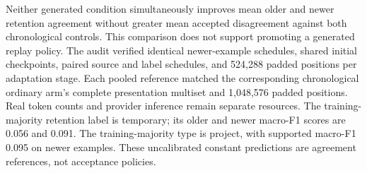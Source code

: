 Neither generated condition simultaneously improves mean older and newer retention agreement without greater mean accepted disagreement against both chronological controls. This comparison does not support promoting a generated replay policy.
The audit verified identical newer-example schedules, shared initial checkpoints, paired source and label schedules, and 524,288 padded positions per adaptation stage. Each pooled reference matched the corresponding chronological ordinary arm's complete presentation multiset and 1,048,576 padded positions. Real token counts and provider inference remain separate resources.
The training-majority retention label is temporary; its older and newer macro-F1 scores are 0.056 and 0.091. The training-majority type is project, with supported macro-F1 0.095 on newer examples. These uncalibrated constant predictions are agreement references, not acceptance policies.
